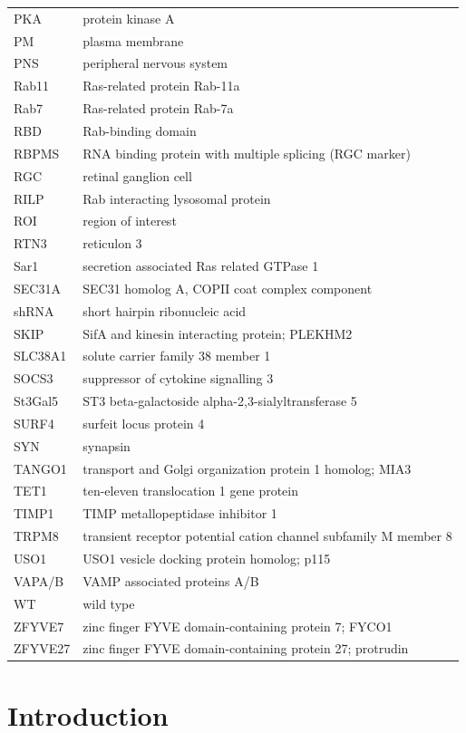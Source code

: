 \documentclass[
  12pt,
  a4paper,
]{book}
\begin{document}
\begin{longtable}[]{@{}
  >{\raggedright\arraybackslash}p{}
  >{\raggedright\arraybackslash}p{}@{}}
PKA & protein kinase A \\
PM & plasma membrane \\
PNS & peripheral nervous system \\
Rab11 & Ras-related protein Rab-11a \\
Rab7 & Ras-related protein Rab-7a \\
RBD & Rab-binding domain \\
RBPMS & RNA binding protein with multiple splicing (RGC marker) \\
RGC & retinal ganglion cell \\
RILP & Rab interacting lysosomal protein \\
ROI & region of interest \\
RTN3 & reticulon 3 \\
Sar1 & secretion associated Ras related GTPase 1 \\
SEC31A & SEC31 homolog A, COPII coat complex component \\
shRNA & short hairpin ribonucleic acid \\
SKIP & SifA and kinesin interacting protein; PLEKHM2 \\
SLC38A1 & solute carrier family 38 member 1 \\
SOCS3 & suppressor of cytokine signalling 3 \\
St3Gal5 & ST3 beta-galactoside alpha-2,3-sialyltransferase 5 \\
SURF4 & surfeit locus protein 4 \\
SYN & synapsin \\
TANGO1 & transport and Golgi organization protein 1 homolog; MIA3 \\
TET1 & ten-eleven translocation 1 gene protein \\
TIMP1 & TIMP metallopeptidase inhibitor 1 \\
TRPM8 & transient receptor potential cation channel subfamily M member 8 \\
USO1 & USO1 vesicle docking protein homolog; p115 \\
VAPA/B & VAMP associated proteins A/B \\
WT & wild type \\
ZFYVE7 & zinc finger FYVE domain-containing protein 7; FYCO1 \\
ZFYVE27 & zinc finger FYVE domain-containing protein 27; protrudin \\
\bottomrule()
\end{longtable}

\hypertarget{INTRODUCTION}{%
\chapter*{Introduction}\label{INTRODUCTION}}
\end{document}
